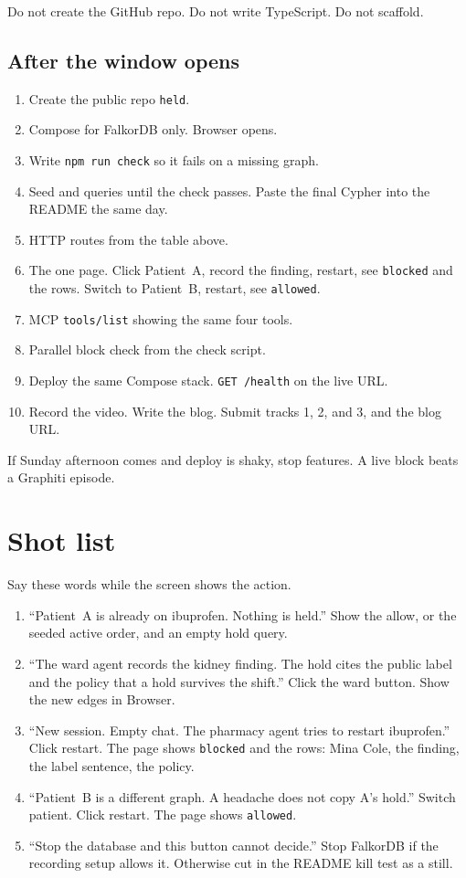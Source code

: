 \documentclass[11pt,a4paper]{article}
\newcommand{\code}[1]{\texttt{#1}}
\begin{document}
Do not create the GitHub repo. Do not write TypeScript. Do not scaffold.

\subsection{After the window opens}

\begin{enumerate}
  \item Create the public repo \code{held}.
  \item Compose for FalkorDB only. Browser opens.
  \item Write \code{npm run check} so it fails on a missing graph.
  \item Seed and queries until the check passes. Paste the final Cypher into the README the same day.
  \item HTTP routes from the table above.
  \item The one page. Click Patient~A, record the finding, restart, see \code{blocked} and the rows. Switch to Patient~B, restart, see \code{allowed}.
  \item MCP \code{tools/list} showing the same four tools.
  \item Parallel block check from the check script.
  \item Deploy the same Compose stack. \code{GET /health} on the live URL.
  \item Record the video. Write the blog. Submit tracks 1, 2, and 3, and the blog URL.
\end{enumerate}

If Sunday afternoon comes and deploy is shaky, stop features. A live block beats a Graphiti episode.

\section{Shot list}

Say these words while the screen shows the action.

\begin{enumerate}
  \item ``Patient~A is already on ibuprofen. Nothing is held.'' Show the allow, or the seeded active order, and an empty hold query.
  \item ``The ward agent records the kidney finding. The hold cites the public label and the policy that a hold survives the shift.'' Click the ward button. Show the new edges in Browser.
  \item ``New session. Empty chat. The pharmacy agent tries to restart ibuprofen.'' Click restart. The page shows \code{blocked} and the rows: Mina Cole, the finding, the label sentence, the policy.
  \item ``Patient~B is a different graph. A headache does not copy A's hold.'' Switch patient. Click restart. The page shows \code{allowed}.
  \item ``Stop the database and this button cannot decide.'' Stop FalkorDB if the recording setup allows it. Otherwise cut in the README kill test as a still.
\end{enumerate}
\end{document}
